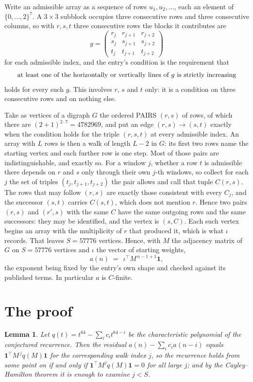 \documentclass[11pt,a4paper]{article}
\theoremstyle{plain}
\newtheorem{lemma}[theorem]{Lemma}
\theoremstyle{definition}
\begin{document}
Write an admissible array as a sequence of rows $u_1,u_2,\dots$, each an element of
$\{0,\dots,2\}^{7}$. A $3\times3$ subblock occupies three consecutive rows and
three consecutive columns, so with $r,s,t$ three consecutive rows the blocks it
contributes are
\[
g=\begin{pmatrix}r_j&r_{j+1}&r_{j+2}\\ s_j&s_{j+1}&s_{j+2}\\ t_j&t_{j+1}&t_{j+2}\end{pmatrix}
\]
for each admissible index, and the entry's condition is the requirement that
\[
\text{at least one}\text{ of the horizontally or vertically lines of }g\text{ \text{is strictly increasing}}
\]
holds for every such $g$. This involves $r$, $s$ and $t$ only: it is a condition on
three consecutive rows and on nothing else.

Take as vertices of a digraph $G$ the ordered PAIRS $(r,s)$ of rows, of which there are
$(2+1)^{2\cdot7}=4782969$, and put an edge $(r,s)\to(s,t)$ exactly when the condition
holds for the triple $(r,s,t)$ at every admissible index. An array with $L$ rows is then a
walk of length $L-2$ in $G$: its first two rows name the starting vertex and each further
row is one step. Most of those pairs are indistinguishable, and exactly so. For a window $j$, whether a row $t$ is admissible there depends on $r$ and $s$ only through their own $j$-th windows, so collect for each $j$ the set of triples $(t_j,t_{j+1},t_{j+2})$ the pair allows and call that tuple $C(r,s)$. The rows that may follow $(r,s)$ are exactly those consistent with every $C_j$, and the successor $(s,t)$ carries $C(s,t)$, which does not mention $r$. Hence two pairs $(r,s)$ and $(r',s)$ with the same $C$ have the same outgoing rows and the same successors: they may be identified, and the vertex is $(s,C)$. Each such vertex begins an array with the multiplicity of $r$ that produced it, which is what $\iota$ records. That leaves $S=57776$ vertices. Hence, with $M$ the adjacency matrix of $G$ on $S=57776$ vertices and
$\iota$ the vector of starting weights,
\[
a(n)\;=\;\,\iota^{\!\top}M^{\,n-1+1}\mathbf{1},
\]
the exponent being fixed by the entry's own shape and checked against its published terms.
In particular $a$ is $C$-finite.

\section{The proof}

\begin{lemma}\label{lem:crit}
Let $q(t)=t^{64}-\sum_i c_it^{64-i}$ be the characteristic polynomial of the
conjectured recurrence. Then the residual $a(n)-\sum_ic_ia(n-i)$ equals
$\mathbf{1}^{\!\top}M^{\,j}q(M)\mathbf{1}$ for the corresponding walk index
$j$, so the recurrence holds from some point on if and only if
$\mathbf{1}^{\!\top}M^{j}q(M)\mathbf{1}=0$ for all large $j$; and by the
Cayley--Hamilton theorem it is enough to examine $j<S$.
\end{lemma}
\end{document}

